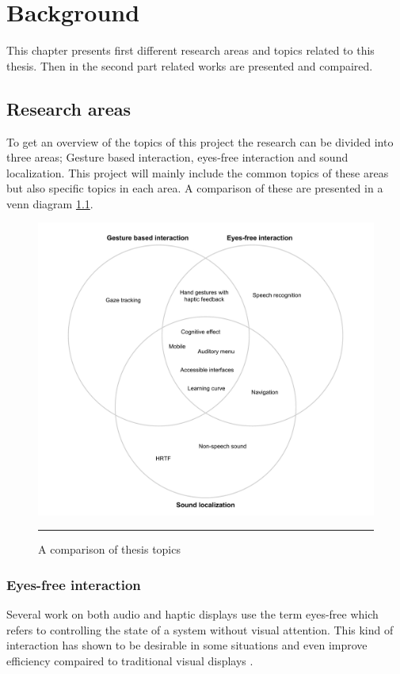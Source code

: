 \chapter{Background}
This chapter presents first different research areas and topics related to this thesis. Then in the second part related works are presented and compaired.

\section{Research areas}
To get an overview of the topics of this project the research can be divided into three areas; Gesture based interaction, eyes-free interaction and sound localization. This project will mainly include the common topics of these areas but also specific topics in each area. A comparison of these are presented in a venn diagram \ref{fig:Venn}.

\begin{figure}[htbp]
	\centering
		\includegraphics[width=\textwidth,height=\textheight,keepaspectratio]{./Figures/venn-diagram.pdf}
		\rule{35em}{0.5pt}
	\caption[Venn diagram]{A comparison of thesis topics}
	\label{fig:Venn}
\end{figure}

\subsection{Eyes-free interaction}
Several work on both audio \cite{kajastila_eyes-free_2013,bonner_no-look_2010,brewster_multimodaleyes-freeinteraction_2003,zhao_earpod:_2007,vazquez-alvarez_eyes-free_2011} and haptic \cite{pasquero_haptic_2011,pielot_tactile_2011} displays use the term eyes-free which refers to controlling the state of a system without visual attention. This kind of interaction has shown to be desirable in some situations \cite{oakley_designing_2007,yi_exploring_2012} and even improve efficiency compaired to traditional visual displays \cite{zhao_earpod:_2007}.

